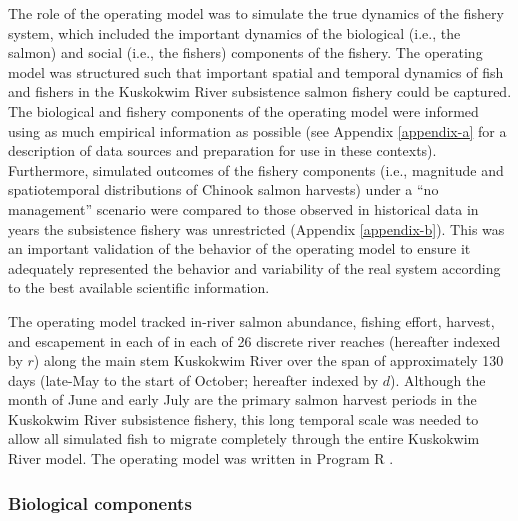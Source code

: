 \documentclass[12pt,]{book}
\theoremstyle{definition}
\theoremstyle{definition}
\theoremstyle{definition}
\theoremstyle{remark}
\begin{document}
\noindent
The role of the operating model was to simulate the true dynamics of the
fishery system, which included the important dynamics of the biological
(i.e., the salmon) and social (i.e., the fishers) components of the
fishery. The operating model was structured such that important spatial
and temporal dynamics of fish and fishers in the Kuskokwim River
subsistence salmon fishery could be captured. The biological and fishery
components of the operating model were informed using as much empirical
information as possible (see Appendix \ref{appendix-a} for a description
of data sources and preparation for use in these contexts). Furthermore,
simulated outcomes of the fishery components (i.e., magnitude and
spatiotemporal distributions of Chinook salmon harvests) under a ``no
management'' scenario were compared to those observed in historical data
in years the subsistence fishery was unrestricted (Appendix
\ref{appendix-b}). This was an important validation of the behavior of
the operating model to ensure it adequately represented the behavior and
variability of the real system according to the best available
scientific information.

The operating model tracked in-river salmon abundance, fishing effort,
harvest, and escapement in each of in each of 26 discrete river reaches
(hereafter indexed by \(r\)) along the main stem Kuskokwim River over
the span of approximately 130 days (late-May to the start of October;
hereafter indexed by \(d\)). Although the month of June and early July
are the primary salmon harvest periods in the Kuskokwim River
subsistence fishery, this long temporal scale was needed to allow all
simulated fish to migrate completely through the entire Kuskokwim River
model. The operating model was written in Program R \citep{r-cite}.

\subsubsection{Biological components}\label{om-biology}
\end{document}
